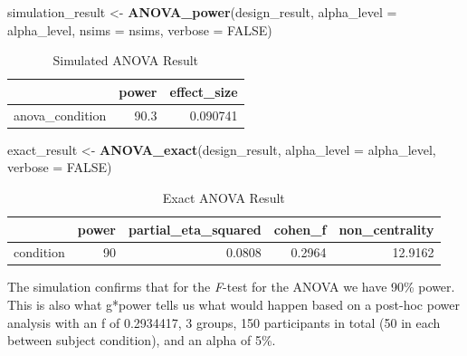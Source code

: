 \documentclass[]{book}
\newenvironment{Shaded}{\begin{snugshade}}{\end{snugshade}}
\newcommand{\DataTypeTok}[1]{\textcolor[rgb]{0.13,0.29,0.53}{#1}}
\newcommand{\KeywordTok}[1]{\textcolor[rgb]{0.13,0.29,0.53}{\textbf{#1}}}
\newcommand{\NormalTok}[1]{#1}
\newcommand{\OtherTok}[1]{\textcolor[rgb]{0.56,0.35,0.01}{#1}}
\newcommand{\StringTok}[1]{\textcolor[rgb]{0.31,0.60,0.02}{#1}}
\begin{document}
\begin{Shaded}
\begin{Highlighting}[]
\NormalTok{simulation_result <-}\StringTok{ }\KeywordTok{ANOVA_power}\NormalTok{(design_result, }
                                 \DataTypeTok{alpha_level =}\NormalTok{ alpha_level, }
                                 \DataTypeTok{nsims =}\NormalTok{ nsims,}
                                 \DataTypeTok{verbose =} \OtherTok{FALSE}\NormalTok{)}
\end{Highlighting}
\end{Shaded}

\begin{table}[!h]

\caption{\label{tab:unnamed-chunk-41}Simulated ANOVA Result}
\centering
\begin{tabular}{l|r|r}
\hline
  & power & effect\_size\\
\hline
anova\_condition & 90.3 & 0.090741\\
\hline
\end{tabular}
\end{table}

\begin{Shaded}
\begin{Highlighting}[]
\NormalTok{exact_result <-}\StringTok{ }\KeywordTok{ANOVA_exact}\NormalTok{(design_result,}
                            \DataTypeTok{alpha_level =}\NormalTok{ alpha_level,}
                            \DataTypeTok{verbose =} \OtherTok{FALSE}\NormalTok{)}
\end{Highlighting}
\end{Shaded}

\begin{table}[!h]

\caption{\label{tab:unnamed-chunk-43}Exact ANOVA Result}
\centering
\begin{tabular}{l|r|r|r|r}
\hline
  & power & partial\_eta\_squared & cohen\_f & non\_centrality\\
\hline
condition & 90 & 0.0808 & 0.2964 & 12.9162\\
\hline
\end{tabular}
\end{table}

The simulation confirms that for the \emph{F}-test for the ANOVA we have 90\% power. This is also what g*power tells us what would happen based on a post-hoc power analysis with an f of 0.2934417, 3 groups, 150 participants in total (50 in each between subject condition), and an alpha of 5\%.
\end{document}
